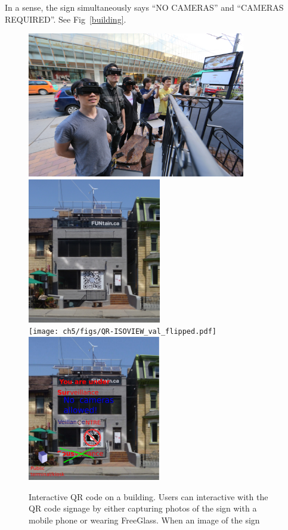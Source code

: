 In a sense, the sign simultaneously says ``NO CAMERAS''
and ``CAMERAS REQUIRED''.
See Fig~\ref{building}.
\begin{figure}[!t]
    \centering
    \includegraphics[height=2.5in]{ch5/figs/wearable/low_res/qr_3_eyeglass_IMG_2193.jpg}
    \includegraphics[height=2.5in]{ch5/figs/decon330dundasd2crop_lowres.jpg} \\
    \texttt{[image: ch5/figs/QR-ISOVIEW\_val\_flipped.pdf]}
    \includegraphics[height=2.5in]{ch5/figs/SurveillanceSousveillance330dundas4.pdf}
    \caption{Interactive QR code on a building.
             Users can interactive with the QR code
             signage by either capturing photos of
 the sign with a mobile phone or wearing FreeGlass. When an image of the sign
}
\end{figure}
